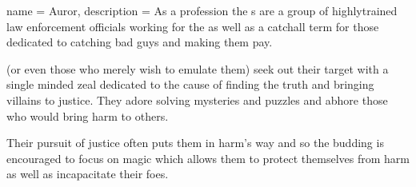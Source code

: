 \archetype
{
	name = Auror,
	description = As a profession\comma{} the \auror{}s are a group of highly\minus{}trained law enforcement officials working for the \comma{} as well as a catchall term for those dedicated to catching bad guys and making them pay.

 (or even those who merely wish to emulate them) seek out their target with a single minded zeal\comma{} dedicated to the cause of finding the truth and bringing villains to justice. They adore solving mysteries and puzzles\comma{} and abhore those who would bring harm to others. 

Their pursuit of justice often puts them in harm's way\comma{} and so the budding \auror{} is encouraged to focus on magic which allows them to protect themselves from harm\comma{} as well as incapacitate their foes. 

}
